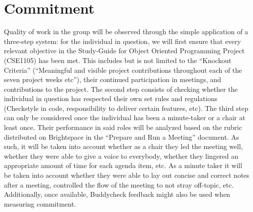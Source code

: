 \section{Commitment}
 Quality of work in the group will be observed through the simple application of a three-step system: for the individual in question, we will first ensure that every relevant objective in the Study-Guide for Object Oriented Programming Project (CSE1105) has been met. This includes but is not limited to the “Knockout Criteria'' (“Meaningful and visible project contributions throughout each of the seven project weeks etc”), their continued participation in meetings, and contributions to the project. The second step consists of checking whether the individual in question has respected their own set rules and regulations (Checkstyle in code, responsibility to deliver certain features, etc). The third step can only be considered once the individual has been a minute-taker or a chair at least once. Their performance in said roles will be analyzed based on the rubric distributed on Brightspace in the “Prepare and Run a Meeting” document. As such, it will be taken into account whether as a chair they led the meeting well, whether they were able to give a voice to everybody, whether they lingered an appropriate amount of time for each agenda item, etc. As a minute taker it will be taken into account whether they were able to lay out concise and correct notes after a meeting, controlled the flow of the meeting to not stray off-topic, etc. Additionally, once available, Buddycheck feedback might also be used when measuring commitment.
